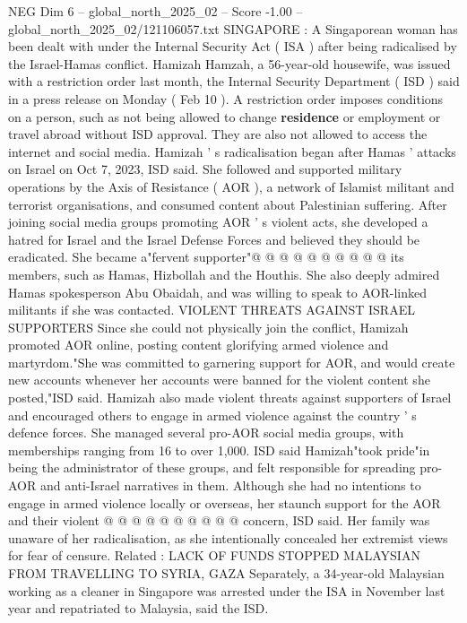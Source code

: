\begin{textsample}{NEG Dim 6 – global\_north\_2025\_02 – Score -1.00 – global\_north\_2025\_02/121106057.txt}  \label{ex:f6_neg_109}
SINGAPORE : A Singaporean woman has been dealt with under the Internal Security Act ( ISA ) after being radicalised by the Israel-Hamas conflict.
Hamizah Hamzah, a 56-year-old housewife, was issued with a restriction order last month, the Internal Security Department ( ISD ) said in a press release on Monday ( Feb 10 ).
A restriction order imposes conditions on a person, such as not being allowed to change \textbf{residence} or employment or travel abroad without ISD approval.
They are also not allowed to access the internet and social media.
Hamizah ' s radicalisation began after Hamas ' attacks on Israel on Oct 7, 2023, ISD said.
She followed and supported military operations by the Axis of Resistance ( AOR ), a network of Islamist militant and terrorist organisations, and consumed content about Palestinian suffering.
After joining social media groups promoting AOR ' s violent acts, she developed a hatred for Israel and the Israel Defense Forces and believed they should be eradicated.
She became a"fervent supporter"@ @ @ @ @ @ @ @ @ @ its members, such as Hamas, Hizbollah and the Houthis.
She also deeply admired Hamas spokesperson Abu Obaidah, and was willing to speak to AOR-linked militants if she was contacted.
VIOLENT THREATS AGAINST ISRAEL SUPPORTERS Since she could not physically join the conflict, Hamizah promoted AOR online, posting content glorifying armed violence and martyrdom."She was committed to garnering support for AOR, and would create new accounts whenever her accounts were banned for the violent content she posted,"ISD said.
Hamizah also made violent threats against supporters of Israel and encouraged others to engage in armed violence against the country ' s defence forces.
She managed several pro-AOR social media groups, with memberships ranging from 16 to over 1,000.
ISD said Hamizah"took pride"in being the administrator of these groups, and felt responsible for spreading pro-AOR and anti-Israel narratives in them.
Although she had no intentions to engage in armed violence locally or overseas, her staunch support for the AOR and their violent @ @ @ @ @ @ @ @ @ @ concern, ISD said.
Her family was unaware of her radicalisation, as she intentionally concealed her extremist views for fear of censure.
Related : LACK OF FUNDS STOPPED MALAYSIAN FROM TRAVELLING TO SYRIA, GAZA Separately, a 34-year-old Malaysian working as a cleaner in Singapore was arrested under the ISA in November last year and repatriated to Malaysia, said the ISD.

\end{textsample}
